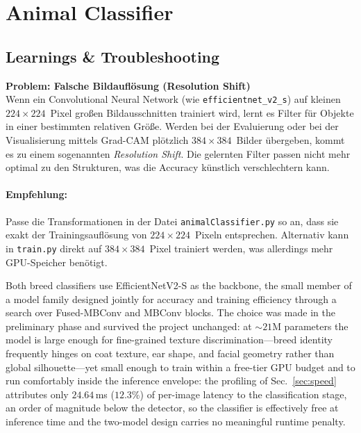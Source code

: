 \section{Animal Classifier}
\label{sec:animal_classifier}

\subsection*{Learnings \& Troubleshooting}

\textbf{Problem: Falsche Bildauflösung (Resolution Shift)} \\
Wenn ein Convolutional Neural Network (wie \texttt{efficientnet\_v2\_s}) auf kleinen $224 \times 224$~Pixel großen Bildausschnitten trainiert wird, lernt es Filter für Objekte in einer bestimmten relativen Größe. Werden bei der Evaluierung oder bei der Visualisierung mittels Grad-CAM plötzlich $384 \times 384$~Bilder übergeben, kommt es zu einem sogenannten \emph{Resolution Shift}. Die gelernten Filter passen nicht mehr optimal zu den Strukturen, was die Accuracy künstlich verschlechtern kann.

\paragraph{Empfehlung:} 
Passe die Transformationen in der Datei \texttt{animalClassifier.py} so an, dass sie exakt der Trainingsauflösung von $224 \times 224$~Pixeln entsprechen. Alternativ kann in \texttt{train.py} direkt auf $384 \times 384$~Pixel trainiert werden, was allerdings mehr GPU-Speicher benötigt.

Both breed classifiers use EfficientNetV2-S \cite{tan2021efficientnetv2} as
the backbone, the small member of a model family designed jointly for
accuracy and training efficiency through a search over Fused-MBConv and
MBConv blocks. The choice was made in the preliminary phase and survived the
project unchanged: at ${\sim}21$M parameters the model is large enough for
fine-grained texture discrimination---breed identity frequently hinges on
coat texture, ear shape, and facial geometry rather than global
silhouette---yet small enough to train within a free-tier GPU budget and to
run comfortably inside the inference envelope: the profiling of
Sec.~\ref{sec:speed} attributes only $24.64$\,ms ($12.3\%$) of per-image
latency to the classification stage, an order of magnitude below the
detector, so the classifier is effectively free at inference time and the
two-model design carries no meaningful runtime penalty.

